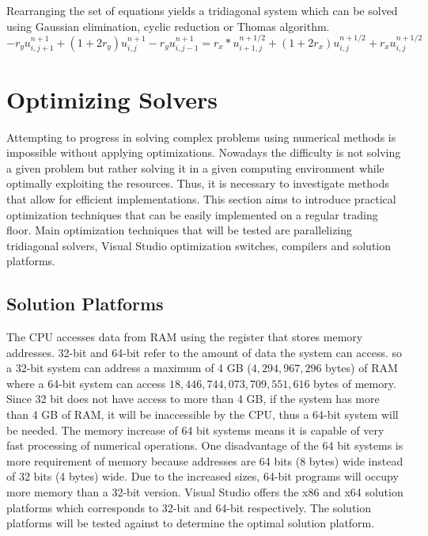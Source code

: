 \documentclass[12pt, oneside]{book}
\theoremstyle{plain}
\theoremstyle{definition}
\begin{document}
Rearranging the set of equations yields a tridiagonal system which can be solved using Gaussian elimination, cyclic reduction or Thomas algorithm.
\begin{equation}
-r_y u^{n+1}_{i,j+1} + (1 + 2r_y) u^{n+1}_{i,j} - r_y u^{n+1}_{i,j-1} = r_x * u^{n+1/2}_{i+1,j} + (1 + 2r_x) u^{n+1/2}_{i,j} + r_x u^{n+1/2}_{i,j}
\end{equation}

\chapter{Optimizing Solvers}

Attempting to progress in solving complex problems using numerical methods is impossible without applying optimizations. Nowadays the difficulty is not solving a given problem but rather solving it in a given computing environment while optimally exploiting the resources. Thus, it is necessary to investigate methods that allow for efficient implementations. This section aims to introduce practical optimization techniques that can be easily implemented on a regular trading floor. Main optimization techniques that will be tested are parallelizing tridiagonal solvers, Visual Studio optimization switches, compilers and solution platforms.

\section{Solution Platforms}
The CPU accesses data from RAM using the register that stores memory addresses. 32-bit and 64-bit refer to the amount of data the system can access. so a 32-bit system can address a maximum of 4 GB ($4,294,967,296$ bytes) of RAM where a 64-bit system can access $18,446,744,073,709,551,616$ bytes of memory. Since 32 bit does not have access to more than 4 GB, if the system has more than 4 GB of RAM, it will be inaccessible by the CPU, thus a 64-bit system will be needed. The memory increase of 64 bit systems means it is capable of very fast processing of numerical operations. One disadvantage of the 64 bit systems is more requirement of memory because addresses are 64 bits (8 bytes) wide instead of 32 bits (4 bytes) wide. Due to the increased sizes, 64-bit programs will occupy more memory than a 32-bit version. Visual Studio offers the x86 and x64 solution platforms which corresponds to 32-bit and 64-bit respectively. The solution platforms will be tested against to determine the optimal solution platform.
\end{document}
